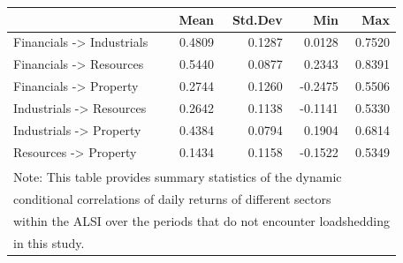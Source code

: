 \documentclass[11pt,preprint, authoryear]{elsarticle}
\let\origtable\table
\let\endorigtable\endtable
\renewenvironment{table}[1][2] {
    \expandafter\origtable\expandafter[H]
} {
    \endorigtable
}
\numberwithin{equation}{section}
\numberwithin{figure}{section}
\numberwithin{table}{section}
\begin{document}
\begin{table}
\centering\begingroup\fontsize{9}{11}\selectfont

\begin{tabular}{l|r|r|r|r}
\hline
  & Mean & Std.Dev & Min & Max\\
\hline
Financials -> Industrials & 0.4809 & 0.1287 & 0.0128 & 0.7520\\
\hline
Financials -> Resources & 0.5440 & 0.0877 & 0.2343 & 0.8391\\
\hline
Financials -> Property & 0.2744 & 0.1260 & -0.2475 & 0.5506\\
\hline
Industrials -> Resources & 0.2642 & 0.1138 & -0.1141 & 0.5330\\
\hline
Industrials -> Property & 0.4384 & 0.0794 & 0.1904 & 0.6814\\
\hline
Resources -> Property & 0.1434 & 0.1158 & -0.1522 & 0.5349\\
\hline
\multicolumn{5}{l}{\textsuperscript{} Note: This table provides summary statistics of the dynamic}\\
\multicolumn{5}{l}{conditional correlations of daily returns of different sectors}\\
\multicolumn{5}{l}{within the ALSI over the periods that do not encounter loadshedding}\\
\multicolumn{5}{l}{in this study.}\\
\end{tabular}
\endgroup{}
\end{table}


\end{document}
